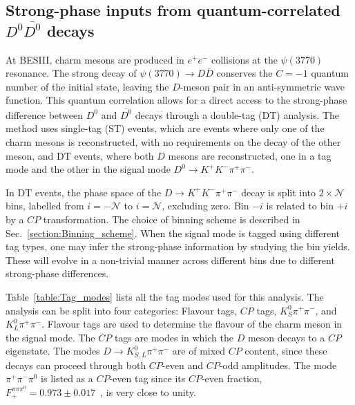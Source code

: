 \documentclass[12pt, a4paper, notitlepage, onecolumn]{article}
\begin{document}
\subsection{Strong-phase inputs from quantum-correlated \texorpdfstring{$D^0\bar{D^0}$}{DD} decays}
\noindent At BESIII, charm mesons are produced in $e^+e^-$ collisions at the $\psi(3770)$ resonance. The strong decay of $\psi(3770)\to D\bar{D}$ conserves the $C = -1$ quantum number of the initial state, leaving the $D$-meson pair in an anti-symmetric wave function. This quantum correlation allows for a direct access to the strong-phase difference between $D^0$ and $\bar{D^0}$ decays through a double-tag (DT) analysis. The method uses single-tag (ST) events, which are events where only one of the charm mesons is reconstructed, with no requirements on the decay of the other meson, and DT events, where both $D$ mesons are reconstructed, one in a tag mode and the other in the signal mode $D^0\to K^+K^-\pi^+\pi^-$.

In DT events, the phase space of the $D\to K^+K^-\pi^+\pi^-$ decay is split into $2\times\mathcal{N}$ bins, labelled from $i = -\mathcal{N}$ to $i = \mathcal{N}$, excluding zero. Bin $-i$ is related to bin $+i$ by a $C\!P$ transformation. The choice of binning scheme is described in Sec.~\ref{section:Binning_scheme}. When the signal mode is tagged using different tag types, one may infer the strong-phase information by studying the bin yields. These will evolve in a non-trivial manner across different bins due to different strong-phase differences.

Table~\ref{table:Tag_modes} lists all the tag modes used for this analysis. The analysis can be split into four categories: Flavour tags, $C\!P$ tags, $K_S^0\pi^+\pi^-$, and $K_L^0\pi^+\pi^-$. Flavour tags are used to determine the flavour of the charm meson in the signal mode. The $C\!P$ tags are modes in which the $D$ meson decays to a $C\!P$ eigenstate. The modes $D\to K_{S, L}^0\pi^+\pi^-$ are of mixed $C\!P$ content, since these decays can proceed through both $C\!P$-even and $C\!P$-odd amplitudes. The mode $\pi^+\pi^-\pi^0$ is listed as a $C\!P$-even tag since its $C\!P$-even fraction, $F_+^{\pi\pi\pi^0} = 0.973 \pm 0.017$~\cite{cite:pipipi0_CPfraction}, is very close to unity.
\end{document}
